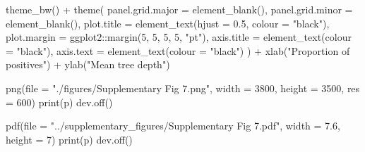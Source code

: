 \documentclass[
  11pt,
  oneside]{book}
\newenvironment{Shaded}{\begin{snugshade}}{\end{snugshade}}
\newcommand{\AttributeTok}[1]{\textcolor[rgb]{0.77,0.63,0.00}{#1}}
\newcommand{\DecValTok}[1]{\textcolor[rgb]{0.00,0.00,0.81}{#1}}
\newcommand{\FloatTok}[1]{\textcolor[rgb]{0.00,0.00,0.81}{#1}}
\newcommand{\FunctionTok}[1]{\textcolor[rgb]{0.00,0.00,0.00}{#1}}
\newcommand{\NormalTok}[1]{#1}
\newcommand{\SpecialCharTok}[1]{\textcolor[rgb]{0.00,0.00,0.00}{#1}}
\newcommand{\StringTok}[1]{\textcolor[rgb]{0.31,0.60,0.02}{#1}}
\begin{document}
\begin{Shaded}
\begin{Highlighting}[]
  \FunctionTok{theme\_bw}\NormalTok{() }\SpecialCharTok{+}
  \FunctionTok{theme}\NormalTok{(}
    \AttributeTok{panel.grid.major =} \FunctionTok{element\_blank}\NormalTok{(),}
    \AttributeTok{panel.grid.minor =} \FunctionTok{element\_blank}\NormalTok{(),}
    \AttributeTok{plot.title =} \FunctionTok{element\_text}\NormalTok{(}\AttributeTok{hjust =} \FloatTok{0.5}\NormalTok{, }\AttributeTok{colour =} \StringTok{"black"}\NormalTok{),}
    \AttributeTok{plot.margin =}\NormalTok{ ggplot2}\SpecialCharTok{::}\FunctionTok{margin}\NormalTok{(}\DecValTok{5}\NormalTok{, }\DecValTok{5}\NormalTok{, }\DecValTok{5}\NormalTok{, }\DecValTok{5}\NormalTok{, }\StringTok{"pt"}\NormalTok{),}
    \AttributeTok{axis.title =} \FunctionTok{element\_text}\NormalTok{(}\AttributeTok{colour =} \StringTok{"black"}\NormalTok{),}
    \AttributeTok{axis.text =} \FunctionTok{element\_text}\NormalTok{(}\AttributeTok{colour =} \StringTok{"black"}\NormalTok{)}
\NormalTok{  ) }\SpecialCharTok{+}
  \FunctionTok{xlab}\NormalTok{(}\StringTok{"Proportion of positives"}\NormalTok{) }\SpecialCharTok{+}
  \FunctionTok{ylab}\NormalTok{(}\StringTok{"Mean tree depth"}\NormalTok{)}
\end{Highlighting}
\end{Shaded}

\begin{Shaded}
\begin{Highlighting}[]
\FunctionTok{png}\NormalTok{(}\AttributeTok{file =} \StringTok{"./figures/Supplementary Fig 7.png"}\NormalTok{, }\AttributeTok{width =} \DecValTok{3800}\NormalTok{, }\AttributeTok{height =} \DecValTok{3500}\NormalTok{, }\AttributeTok{res =} \DecValTok{600}\NormalTok{)}
\FunctionTok{print}\NormalTok{(p)}
\FunctionTok{dev.off}\NormalTok{()}

\FunctionTok{pdf}\NormalTok{(}\AttributeTok{file =} \StringTok{"../supplementary\_figures/Supplementary Fig 7.pdf"}\NormalTok{, }\AttributeTok{width =} \FloatTok{7.6}\NormalTok{, }\AttributeTok{height =} \DecValTok{7}\NormalTok{)}
\FunctionTok{print}\NormalTok{(p)}
\FunctionTok{dev.off}\NormalTok{()}
\end{Highlighting}
\end{Shaded}
\end{document}
